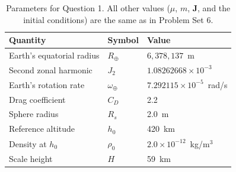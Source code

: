\documentclass[11pt,letterpaper]{article}
\newcommand{\bJ}{\mathbf{J}}
\begin{document}
\begin{table}[H]
\centering
\small
\begin{tabular}{lll}
\toprule
Quantity & Symbol & Value \\
\midrule
Earth's equatorial radius & $R_\oplus$ & $6{,}378{,}137$~m \\
Second zonal harmonic & $J_2$ & $1.08262668\times10^{-3}$ \\
Earth's rotation rate & $\omega_\oplus$ & $7.292115\times10^{-5}$~rad/s \\
Drag coefficient & $C_D$ & 2.2 \\
Sphere radius & $R_s$ & 2.0~m \\
Reference altitude & $h_0$ & 420~km \\
Density at $h_0$ & $\rho_0$ & $2.0\times10^{-12}$~kg/m$^3$ \\
Scale height & $H$ & 59~km \\
\bottomrule
\end{tabular}
\caption{Parameters for Question 1. All other values ($\mu$, $m$, $\bJ$, and the initial conditions) are the same as in Problem Set 6.}
\label{tab:q1}
\end{table}
\end{document}

